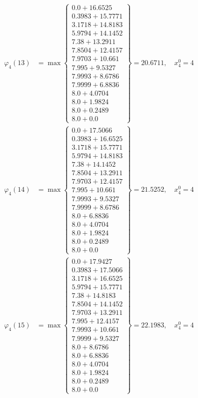 \documentclass{article}
\begin{document}
\begin{align*}
\varphi_{4}(13) &= \max \left\{ \begin{array}{c}
0.0 + 16.6525 \\
 0.3983 + 15.7771 \\
 3.1718 + 14.8183 \\
 5.9794 + 14.1452 \\
 7.38 + 13.2911 \\
 7.8504 + 12.4157 \\
 7.9703 + 10.661 \\
 7.995 + 9.5327 \\
 7.9993 + 8.6786 \\
 7.9999 + 6.8836 \\
 8.0 + 4.0704 \\
 8.0 + 1.9824 \\
 8.0 + 0.2489 \\
 8.0 + 0.0
\end{array} \right\}=20.6711, \quad x_{4}^0=4\\
  
\varphi_{4}(14) &= \max \left\{ \begin{array}{c}
0.0 + 17.5066 \\
 0.3983 + 16.6525 \\
 3.1718 + 15.7771 \\
 5.9794 + 14.8183 \\
 7.38 + 14.1452 \\
 7.8504 + 13.2911 \\
 7.9703 + 12.4157 \\
 7.995 + 10.661 \\
 7.9993 + 9.5327 \\
 7.9999 + 8.6786 \\
 8.0 + 6.8836 \\
 8.0 + 4.0704 \\
 8.0 + 1.9824 \\
 8.0 + 0.2489 \\
 8.0 + 0.0
\end{array} \right\}=21.5252, \quad x_{4}^0=4\\
  
\varphi_{4}(15) &= \max \left\{ \begin{array}{c}
0.0 + 17.9427 \\
 0.3983 + 17.5066 \\
 3.1718 + 16.6525 \\
 5.9794 + 15.7771 \\
 7.38 + 14.8183 \\
 7.8504 + 14.1452 \\
 7.9703 + 13.2911 \\
 7.995 + 12.4157 \\
 7.9993 + 10.661 \\
 7.9999 + 9.5327 \\
 8.0 + 8.6786 \\
 8.0 + 6.8836 \\
 8.0 + 4.0704 \\
 8.0 + 1.9824 \\
 8.0 + 0.2489 \\
 8.0 + 0.0
\end{array} \right\}=22.1983, \quad x_{4}^0=4\\
  

\end{align*}
\end{document}
